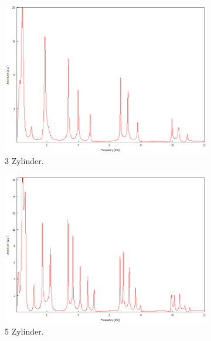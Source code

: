 \begin{figure}
    \centering
    \begin{subfigure}[b]{0.3\textwidth}
        \centering
        \includegraphics[width=\textwidth]{data/4_1/3.png}
        \caption{3 Zylinder.}
    \end{subfigure}
    \hfill
    \begin{subfigure}[b]{0.3\textwidth}
        \centering
        \includegraphics[width=\textwidth]{data/4_1/5.png}
        \caption{5 Zylinder.}
    \end{subfigure}
    \hfill
    \begin{subfigure}[b]{0.3\textwidth}
        \centering

\end{subfigure}
\end{figure}
